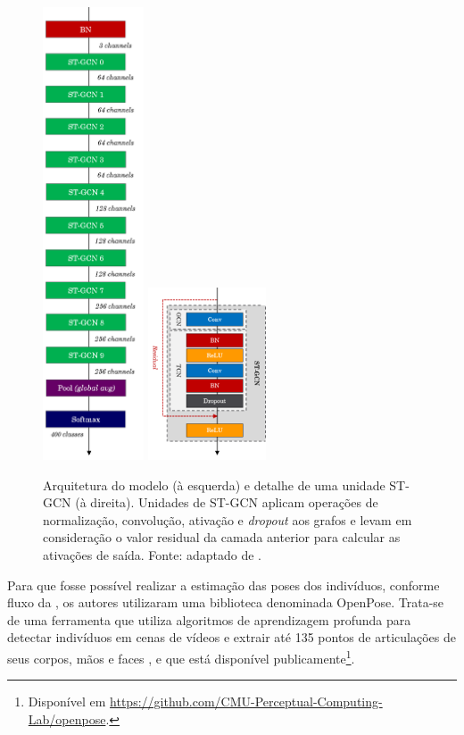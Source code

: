 \begin{figure}[ht]
    \centering
    \includegraphics[width=3.0cm]{images/st_gcn_architecture}
    \includegraphics[width=3.5cm]{images/st_gcn_architeture_unit}
    \caption{Arquitetura do modelo (à esquerda) e detalhe de uma unidade ST-GCN (à direita). Unidades de ST-GCN aplicam operações de normalização, convolução, ativação e \textit{dropout} aos grafos e levam em consideração o valor residual da camada anterior para calcular as ativações de saída. Fonte: adaptado de \cite{st-gcn-2018}.}
    \label{fig:st-gcn-architecture}
\end{figure}


Para que fosse possível realizar a estimação das poses dos indivíduos, conforme fluxo da , os autores utilizaram uma biblioteca denominada OpenPose. Trata-se de uma ferramenta que utiliza algoritmos de aprendizagem profunda para detectar indivíduos em cenas de vídeos e extrair até 135 pontos de articulações de seus corpos, mãos e faces \cite{cao-realtime-2017, simon-hand-2017, wei-cpm-2016}, e que está disponível publicamente\footnote{
    Disponível em \url{https://github.com/CMU-Perceptual-Computing-Lab/openpose}.
}.

